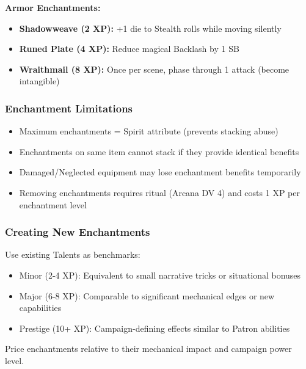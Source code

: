 \textbf{Armor Enchantments:}
\begin{itemize}
\item \textbf{Shadowweave (2 XP):} +1 die to Stealth rolls while moving silently
\item \textbf{Runed Plate (4 XP):} Reduce magical Backlash by 1 SB
\item \textbf{Wraithmail (8 XP):} Once per scene, phase through 1 attack (become intangible)
\end{itemize}

\subsubsection{Enchantment Limitations}

\begin{itemize}
\item Maximum enchantments = Spirit attribute (prevents stacking abuse)
\item Enchantments on same item cannot stack if they provide identical benefits
\item Damaged/Neglected equipment may lose enchantment benefits temporarily
\item Removing enchantments requires ritual (Arcana DV 4) and costs 1 XP per enchantment level
\end{itemize}

\subsubsection{Creating New Enchantments}

Use existing Talents as benchmarks:
\begin{itemize}
\item Minor (2-4 XP): Equivalent to small narrative tricks or situational bonuses
\item Major (6-8 XP): Comparable to significant mechanical edges or new capabilities
\item Prestige (10+ XP): Campaign-defining effects similar to Patron abilities
\end{itemize}

Price enchantments relative to their mechanical impact and campaign power level.
